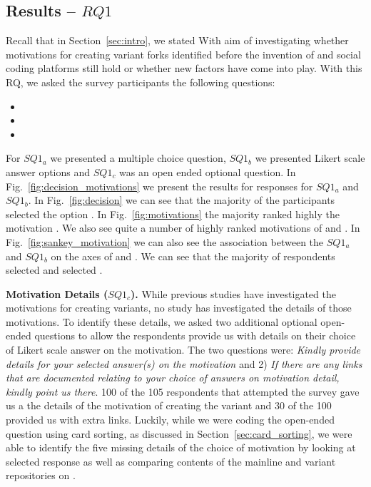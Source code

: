 \subsection{Results -- $RQ1$}
Recall that in Section~\ref{sec:intro}, we stated 
\textbf{\rqOne} With aim of investigating whether motivations for creating variant forks identified before the invention of \git and social coding platforms
still hold or whether new factors have come into play.
With this RQ, we asked the survey participants the following questions:

\begin{itemize}
\item \rqOneOne
\item \rqOneTwo
\item \rqOneThree
\end{itemize}


For $SQ1_{a}$ we presented a multiple choice question, $SQ1_{b}$ we presented Likert scale answer options and $SQ1_{c}$ was an open ended optional question.
In Fig.~\ref{fig:decision_motivations} we present the results for responses for $SQ1_{a}$ and $SQ1_{b}$. In Fig.~\ref{fig:decision} we can see that the majority of the participants selected the option . In Fig.~\ref{fig:motivations} the majority ranked highly the motivation . We also see quite a number of highly ranked motivations of  and . In Fig.~\ref{fig:sankey_motivation} we can also see the association between the $SQ1_{a}$ and $SQ1_{b}$ on the axes of  and . We can see that the majority of respondents selected  and selected .


\nd \textbf{Motivation Details ($SQ1_{c}$).} While previous studies have investigated the motivations for creating variants, no study has investigated the details of those motivations.
To identify these details, we asked two additional optional open-ended questions to allow the respondents provide us with details on their choice of Likert scale answer on the motivation. The two questions were: \emph{Kindly provide details for your selected answer(s) on the motivation} and 2) \emph{If there are any links that are documented relating to your choice of answers on motivation detail, kindly point us there}. 100 of the 105 respondents that attempted the survey gave us a the details of the motivation of creating the variant and 30 of the 100 provided us with extra links. Luckily, while we were coding the open-ended question using card sorting, as discussed in Section~\ref{sec:card_sorting}, we were able to identify the five missing details of the choice of motivation by looking at selected response as well as comparing contents of the mainline and variant repositories on \gh.

